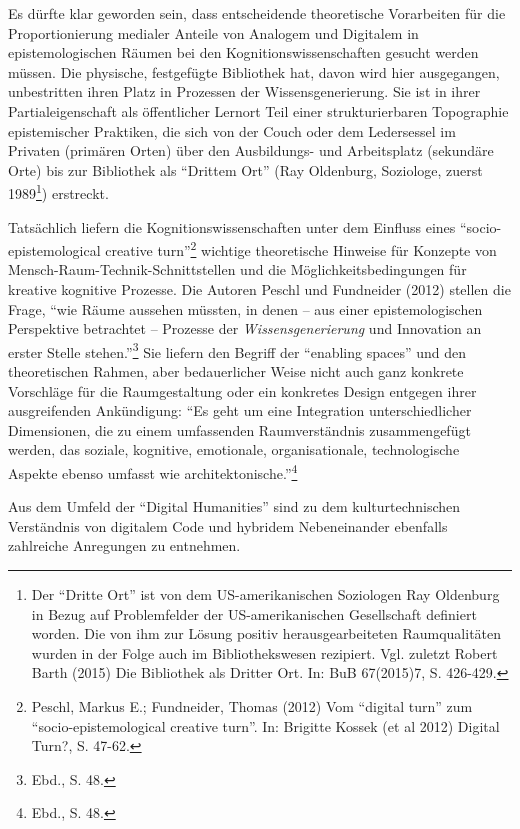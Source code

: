 \documentclass[a4paper,
fontsize=11pt,
oneside,
numbers=noperiodatend,
parskip=half-,
bibliography=totoc,
final
]{scrartcl}
\begin{document}
Es dürfte klar geworden sein, dass entscheidende theoretische
Vorarbeiten für die Proportionierung medialer Anteile von Analogem und
Digitalem in epistemologischen Räumen bei den Kognitionswissenschaften
gesucht werden müssen. Die physische, festgefügte Bibliothek hat, davon
wird hier ausgegangen, unbestritten ihren Platz in Prozessen der
Wissensgenerierung. Sie ist in ihrer Partialeigenschaft als öffentlicher
Lernort Teil einer strukturierbaren Topographie epistemischer Praktiken,
die sich von der Couch oder dem Ledersessel im Privaten (primären Orten)
über den Ausbildungs- und Arbeitsplatz (sekundäre Orte) bis zur
Bibliothek als \enquote{Drittem Ort} (Ray Oldenburg, Soziologe, zuerst
1989\footnote{Der \enquote{Dritte Ort} ist von dem US-amerikanischen
  Soziologen Ray Oldenburg in Bezug auf Problemfelder der
  US-amerikanischen Gesellschaft definiert worden. Die von ihm zur
  Lösung positiv herausgearbeiteten Raumqualitäten wurden in der Folge
  auch im Bibliothekswesen rezipiert. Vgl. zuletzt Robert Barth (2015)
  Die Bibliothek als Dritter Ort. In: BuB 67(2015)7, S. 426-429.})
erstreckt.

Tatsächlich liefern die Kognitionswissenschaften unter dem Einfluss
eines \enquote{socio-epistemological creative turn}\footnote{Peschl,
  Markus E.; Fundneider, Thomas (2012) Vom \enquote{digital turn} zum
  \enquote{socio-epistemological creative turn}. In: Brigitte Kossek (et
  al 2012) Digital Turn?, S. 47-62.} wichtige theoretische Hinweise für
Konzepte von Mensch-Raum-Technik-Schnitt\-stellen und die
Möglichkeitsbedingungen für kreative kognitive Prozesse. Die Autoren
Peschl und Fundneider (2012) stellen die Frage, \enquote{wie Räume
aussehen müssten, in denen -- aus einer epistemologischen Perspektive
betrachtet -- Prozesse der \emph{Wissensgenerierung} und Innovation an
erster Stelle stehen.}\footnote{Ebd., S. 48.} Sie liefern den Begriff
der \enquote{enabling spaces} und den theoretischen Rahmen, aber
bedauerlicher Weise nicht auch ganz konkrete Vorschläge für die
Raumgestaltung oder ein konkretes Design entgegen ihrer ausgreifenden
Ankündigung: \enquote{Es geht um eine Integration unterschiedlicher
Dimensionen, die zu einem umfassenden Raumverständnis zusammengefügt
werden, das soziale, kognitive, emotionale, organisationale,
technologische Aspekte ebenso umfasst wie architektonische.}\footnote{Ebd.,
  S. 48.}

Aus dem Umfeld der \enquote{Digital Humanities} sind zu dem
kulturtechnischen Verständnis von digitalem Code und hybridem
Nebeneinander ebenfalls zahlreiche Anregungen zu entnehmen.
\end{document}
